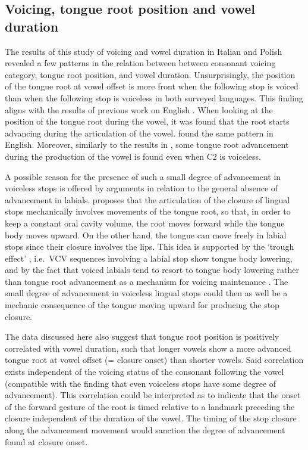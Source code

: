 \documentclass[12pt,]{article}
\begin{document}
\hypertarget{voicing-tongue-root-position-and-vowel-duration}{%
\subsection{Voicing, tongue root position and vowel
duration}\label{voicing-tongue-root-position-and-vowel-duration}}

The results of this study of voicing and vowel duration in Italian and
Polish revealed a few patterns in the relation between between consonant
voicing category, tongue root position, and vowel duration.
Unsurprisingly, the position of the tongue root at vowel offset is more
front when the following stop is voiced than when the following stop is
voiceless in both surveyed languages. This finding aligns with the
results of previous work on English
\citep{kent1969, perkell1969, westbury1983, ahn2018}. When looking at
the position of the tongue root during the vowel, it was found that the
root starts advancing during the articulation of the vowel.
\citet{westbury1983} found the same pattern in English. Moreover,
similarly to the results in \citet{westbury1983}, some tongue root
advancement during the production of the vowel is found even when C2 is
voiceless.

A possible reason for the presence of such a small degree of advancement
in voiceless stops is offered by arguments in relation to the general
absence of advancement in labials. \citet{westbury1983} proposes that
the articulation of the closure of lingual stops mechanically involves
movements of the tongue root, so that, in order to keep a constant oral
cavity volume, the root moves forward while the tongue body moves
upward. On the other hand, the tongue can move freely in labial stops
since their closure involves the lips. This idea is supported by the
`trough effect' \citep{vazquez-alvarez2007}, i.e.~VCV sequences
involving a labial stop show tongue body lowering, and by the fact that
voiced labials tend to resort to tongue body lowering rather than tongue
root advancement as a mechanism for voicing maintenance
\citep{perkell1969, westbury1983, ahn2018}. The small degree of
advancement in voiceless lingual stops could then as well be a mechanic
consequence of the tongue moving upward for producing the stop closure.

The data discussed here also suggest that tongue root position is
positively correlated with vowel duration, such that longer vowels show
a more advanced tongue root at vowel offset (= closure onset) than
shorter vowels. Said correlation exists independent of the voicing
status of the consonant following the vowel (compatible with the finding
that even voiceless stops have some degree of advancement). This
correlation could be interpreted as to indicate that the onset of the
forward gesture of the root is timed relative to a landmark preceding
the closure independent of the duration of the vowel. The timing of the
stop closure along the advancement movement would sanction the degree of
advancement found at closure onset.
\end{document}
